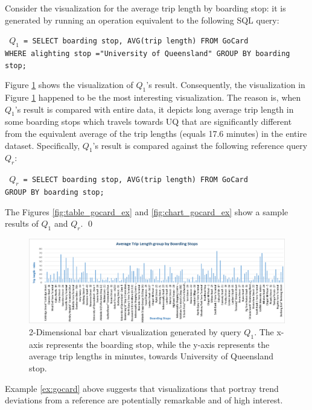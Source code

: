 \begin{example}
Consider the visualization for the average trip length by boarding stop: it is generated by running an operation equivalent to the following SQL query:
%
\begin{center} 
\texttt{ $Q_1$ = SELECT boarding stop, AVG(trip length)  FROM GoCard 
\\ WHERE alighting stop ="University of Queensland"  GROUP BY boarding stop; } 
\end{center}
%
Figure \ref{fig:q1_vis} shows the visualization of $Q_1$'s result.
%
Consequently, the visualization in Figure \ref{fig:q1_vis} happened to be the most interesting visualization.
%
The reason is, when $Q_1$'s result is compared with entire data, it depicts long average trip length in some boarding stops which travels towards UQ that are significantly different from the equivalent average of the trip lengths (equals 17.6 minutes) in the entire dataset.
%
Specifically, $Q_1$'s result is compared against the following reference query $Q_r$:
%
\begin{center} 
\texttt{ $Q_r$ = SELECT boarding stop, AVG(trip length)  FROM GoCard 
\\  GROUP BY boarding stop; } 
\end{center}
%
The Figures \ref{fig:table_gocard_ex} and \ref{fig:chart_gocard_ex} show a sample results of $Q_1$ and $Q_r$.
%
\qed
\end{example}
%
%
%
%
%
%
%
%
\begin{figure}[t] 
	\centering
	\includegraphics[width=\textwidth]{example.png}
 	\caption{2-Dimensional bar chart visualization generated by query $Q_1$. The x-axis represents the boarding stop, while the y-axis represents the average trip lengths in minutes, towards University of Queensland stop.}
	\label{fig:q1_vis}
\end{figure}
%
%
%
%
%
%
%
Example \ref{ex:gocard} above suggests that visualizations that portray trend deviations from a reference are potentially remarkable and of high interest.
%

